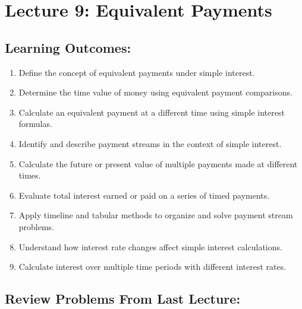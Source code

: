 \documentclass[
]{book}
\providecommand{\tightlist}{%
  \setlength{\itemsep}{0pt}\setlength{\parskip}{0pt}}
\begin{document}
\section*{Lecture 9: Equivalent Payments}\label{lecture-9-equivalent-payments}

\subsection*{Learning Outcomes:}\label{learning-outcomes-8}

\begin{enumerate}
\def\labelenumi{\arabic{enumi}.}
\tightlist
\item
  Define the concept of equivalent payments under simple interest.
\item
  Determine the time value of money using equivalent payment comparisons.
\item
  Calculate an equivalent payment at a different time using simple interest formulas.
\item
  Identify and describe payment streams in the context of simple interest.
\item
  Calculate the future or present value of multiple payments made at different times.
\item
  Evaluate total interest earned or paid on a series of timed payments.
\item
  Apply timeline and tabular methods to organize and solve payment stream problems.
\item
  Understand how interest rate changes affect simple interest calculations.
\item
  Calculate interest over multiple time periods with different interest rates.
\end{enumerate}

\subsection*{Review Problems From Last Lecture:}\label{review-problems-from-last-lecture-7}
\end{document}

